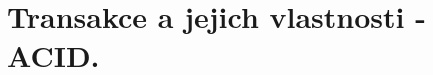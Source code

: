 \documentclass{szzclass}
\begin{document}
\section{Transakce a jejich vlastnosti - ACID.}
\end{document}
